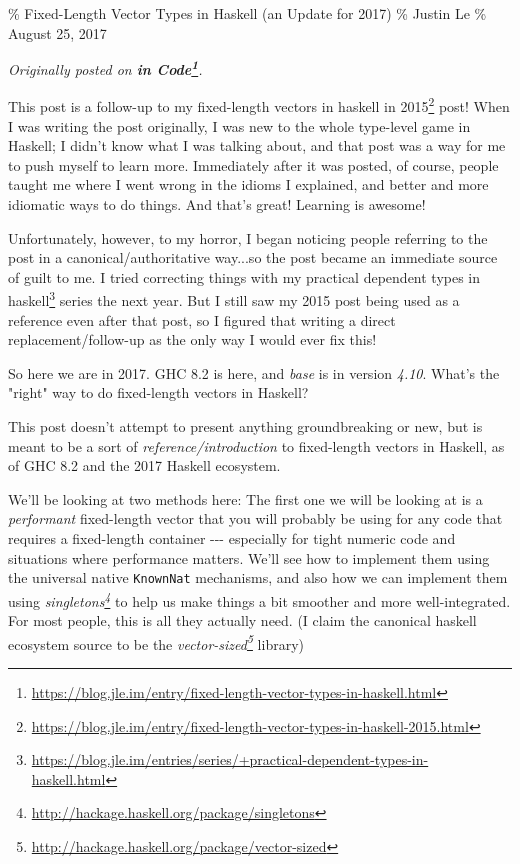 \documentclass[]{article}
\renewcommand{\href}[2]{#2\footnote{\url{#1}}}
\begin{document}
\% Fixed-Length Vector Types in Haskell (an Update for 2017) \% Justin Le \%
August 25, 2017

\emph{Originally posted on
\textbf{\href{https://blog.jle.im/entry/fixed-length-vector-types-in-haskell.html}{in
Code}}.}

This post is a follow-up to my
\href{https://blog.jle.im/entry/fixed-length-vector-types-in-haskell-2015.html}{fixed-length
vectors in haskell in 2015} post! When I was writing the post originally, I was
new to the whole type-level game in Haskell; I didn't know what I was talking
about, and that post was a way for me to push myself to learn more. Immediately
after it was posted, of course, people taught me where I went wrong in the
idioms I explained, and better and more idiomatic ways to do things. And that's
great! Learning is awesome!

Unfortunately, however, to my horror, I began noticing people referring to the
post in a canonical/authoritative way...so the post became an immediate source
of guilt to me. I tried correcting things with my
\href{https://blog.jle.im/entries/series/+practical-dependent-types-in-haskell.html}{practical
dependent types in haskell} series the next year. But I still saw my 2015 post
being used as a reference even after that post, so I figured that writing a
direct replacement/follow-up as the only way I would ever fix this!

So here we are in 2017. GHC 8.2 is here, and \emph{base} is in version
\emph{4.10}. What's the "right" way to do fixed-length vectors in Haskell?

This post doesn't attempt to present anything groundbreaking or new, but is
meant to be a sort of \emph{reference/introduction} to fixed-length vectors in
Haskell, as of GHC 8.2 and the 2017 Haskell ecosystem.

We'll be looking at two methods here: The first one we will be looking at is a
\emph{performant} fixed-length vector that you will probably be using for any
code that requires a fixed-length container -\/-\/- especially for tight numeric
code and situations where performance matters. We'll see how to implement them
using the universal native \texttt{KnownNat} mechanisms, and also how we can
implement them using
\emph{\href{http://hackage.haskell.org/package/singletons}{singletons}} to help
us make things a bit smoother and more well-integrated. For most people, this is
all they actually need. (I claim the canonical haskell ecosystem source to be
the \emph{\href{http://hackage.haskell.org/package/vector-sized}{vector-sized}}
library)
\end{document}
